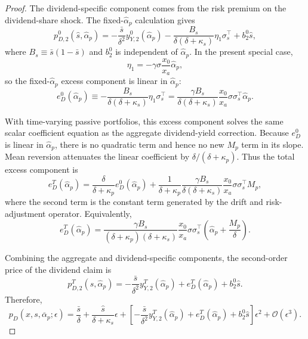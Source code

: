 \begin{proof}
The dividend-specific component comes from the risk premium on the dividend-share shock.
The fixed-$\hat{\alpha}_p$ calculation gives
\begin{equation}
    p_{D,2}^{0}(\hat{s},\hat{\alpha}_p)
    =-\frac{\bar{s}}{\delta^2}y_{Y,2}^{0}(\hat{\alpha}_p)
    -\frac{B_s}{\delta(\delta+\kappa_s)}\eta_1\sigma_s^\top
    +b_2^0\hat{s},
\end{equation}
where $B_s\equiv\bar{s}(1-\bar{s})$ and $b_2^0$ is independent of $\hat{\alpha}_p$.
In the present special case,
\begin{equation}
    \eta_1=-\gamma\sigma\frac{x_0}{x_a}\hat{\alpha}_p,
\end{equation}
so the fixed-$\hat{\alpha}_p$ excess component is linear in $\hat{\alpha}_p$:
\begin{equation}
    e_D^0(\hat{\alpha}_p)
    \equiv
    -\frac{B_s}{\delta(\delta+\kappa_s)}\eta_1\sigma_s^\top
    =\frac{\gamma B_s}{\delta(\delta+\kappa_s)}\frac{x_0}{x_a}\sigma\sigma_s^\top\hat{\alpha}_p.
\end{equation}

With time-varying passive portfolios, this excess component solves the same scalar coefficient equation as the aggregate dividend-yield correction.
Because $e_D^0$ is linear in $\hat{\alpha}_p$, there is no quadratic term and hence no new $M_p$ term in its slope.
Mean reversion attenuates the linear coefficient by $\delta/(\delta+\kappa_p)$.
Thus the total excess component is
\begin{equation}
    e_D^T(\hat{\alpha}_p)
    =\frac{\delta}{\delta+\kappa_p}e_D^0(\hat{\alpha}_p)
    +\frac{1}{\delta+\kappa_p}
    \frac{\gamma B_s}{\delta(\delta+\kappa_s)}\frac{x_0}{x_a}\sigma\sigma_s^\top M_p,
\end{equation}
where the second term is the constant term generated by the drift and risk-adjustment operator.
Equivalently,
\begin{equation}\label{eq:eD-total-noheterog}
    e_D^T(\hat{\alpha}_p)
    =\frac{\gamma B_s}{(\delta+\kappa_p)(\delta+\kappa_s)}\frac{x_0}{x_a}\sigma\sigma_s^\top
    \left(\hat{\alpha}_p+\frac{M_p}{\delta}\right).
\end{equation}

Combining the aggregate and dividend-specific components, the second-order price of the dividend claim is
\begin{equation}\label{eq:pD2-total-noheterog}
    p_{D,2}^T(\hat{s},\hat{\alpha}_p)
    =-\frac{\bar{s}}{\delta^2}y_{Y,2}^T(\hat{\alpha}_p)
    +e_D^T(\hat{\alpha}_p)
    +b_2^0\hat{s}.
\end{equation}
Therefore,
\begin{equation}\label{eq:pD-total-noheterog}
    p_D(x,s,\overline{\alpha}_p;\epsilon)
    =\frac{\bar{s}}{\delta}
    +\frac{\hat{s}}{\delta+\kappa_s}\epsilon
    +\left[-\frac{\bar{s}}{\delta^2}y_{Y,2}^T(\hat{\alpha}_p)
    +e_D^T(\hat{\alpha}_p)+b_2^0\hat{s}\right]\epsilon^2
    +\mathcal{O}(\epsilon^3).
\end{equation}


\end{proof}
